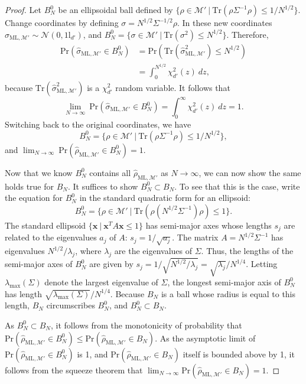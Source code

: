\documentclass[aps,pra, twocolumn]{revtex4-1}
\newcommand{\M}{\mathcal{M}}
\newcommand{\Id}{\mathbb{I}}
\def\Id{1\!\mathrm{l}}
\newcommand{\rhohat}{\hat{\rho}}
\newcommand{\rhoML}[1]{\rhohat_{\scriptscriptstyle{\mathrm{ML},#1}}}
\begin{document}
\begin{proof}
Let $B^{0}_{N}$ be an ellipsoidal ball defined by $\{\rho \in \M'~|~\mathrm{Tr}(\rho \Sigma^{-1} \rho) \leq 1/N^{1/2}\}$. Change coordinates by defining $\sigma = N^{1/2}\Sigma^{-1/2}\rho$. In these new coordinates $\hat{\sigma}_{\mathrm{ML},\M'} \sim \mathcal{N}(0, \Id_{d'})$, and $B^{0}_{N} = \{\sigma \in \M'~|~\mathrm{Tr}(\sigma^{2}) \leq N^{1/2}\}$. Therefore,
\begin{align*}
\mathrm{Pr}(\hat{\sigma}_{\mathrm{ML},\M'} \in B^{0}_{N}) &= \mathrm{Pr}(\mathrm{Tr}(\hat{\sigma}_{\mathrm{ML},\M'}^{2}) \leq N^{1/2})\\
&= \int_{0}^{N^{1/2}}\chi^{2}_{d'}(z)~dz,
\end{align*}
because $\mathrm{Tr}(\hat{\sigma}_{\mathrm{ML},\M'}^{2})$ is a $\chi^{2}_{d'}$ random variable. It follows that
\[\lim_{N \rightarrow \infty}~\mathrm{Pr}(\hat{\sigma}_{\mathrm{ML},\M'} \in B^{0}_{N})  =\int_{0}^{\infty}\chi^{2}_{d'}(z)~dz =1.\]
Switching back to the original coordinates, we have
\[B^{0}_{N} = \{\rho \in \M'~|~\mathrm{Tr}(\rho \Sigma^{-1} \rho) \leq 1/N^{1/2}\},\]
and $\lim_{N \rightarrow \infty}~\mathrm{Pr}(\rhoML{\M'} \in B^{0}_{N}) = 1$.

Now that we know $B^{0}_{N}$ contains all  $\rhoML{\M'}$ as $N\rightarrow \infty$, we can now show the same holds true for $B_{N}$. It suffices to show $B^{0}_{N} \subset B_{N}$. To see that this is the case, write the equation for $B^{0}_{N}$ in the standard quadratic form for an ellipsoid:
\[B^{0}_{N} = \{\rho \in \M'~|~\mathrm{Tr}(\rho ( N^{1/2}\Sigma^{-1} ) \rho) \leq 1\}.\]
The standard ellipsoid $\{\mathbf{x}~|~\mathbf{x}^{T}A\mathbf{x} \leq 1\}$ has semi-major axes whose lengths $s_{j}$ are related to the eigenvalues $a_{j}$ of $A$: $s_{j} = 1/\sqrt{a_{j}}$. The matrix $A = N^{1/2}\Sigma^{-1}$ has eigenvalues $N^{1/2}/\lambda_{j}$, where $\lambda_{j}$ are the eigenvalues of $\Sigma$. Thus, the lengths of the semi-major axes of $B^{0}_{N}$ are given by $s_{j} = 1/\sqrt{N^{1/2}/\lambda_{j}} = \sqrt{\lambda_{j}}/N^{1/4}$. Letting $\lambda_{\max}(\Sigma)$ denote the largest eigenvalue of $\Sigma$, the longest semi-major axis of $B^{0}_{N}$ has length $\sqrt{\lambda_{\max}(\Sigma)}/N^{1/4}$.
Because $B_{N}$ is a ball whose radius is equal to this length, $B_{N}$ circumscribes $B^{0}_{N}$, and $B^{0}_{N} \subset B_{N}$.

As $B^{0}_{N} \subset B_{N}$, it follows from the monotonicity of probability that $\mathrm{Pr}(\rhoML{\M'} \in B^{0}_{N}) \leq \mathrm{Pr}(\rhoML{\M'} \in B_{N})$. As the asymptotic limit of $\mathrm{Pr}(\rhoML{\M'} \in B^{0}_{N})$ is 1, and $\mathrm{Pr}(\rhoML{\M'} \in B_{N})$ itself is bounded above by 1, it follows from the squeeze theorem that $\lim_{N\rightarrow \infty}\mathrm{Pr}(\rhoML{\M'} \in B_{N})=1$.
\end{proof}
\end{document}
